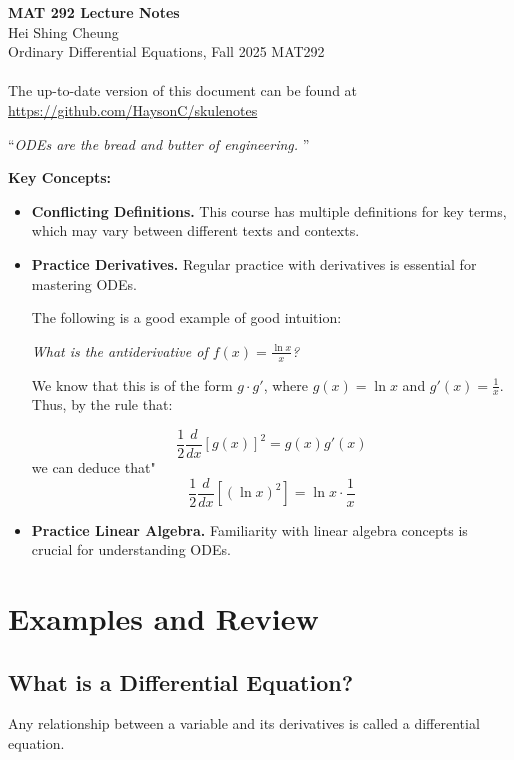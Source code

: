 \documentclass[11pt]{article}
\begin{document}
\thispagestyle{empty}
{\LARGE \bf MAT 292 Lecture Notes}\\
{\large Hei Shing Cheung}\\
Ordinary Differential Equations, Fall 2025 \hfill MAT292\\
\\
The up-to-date version of this document can be found at \url{https://github.com/HaysonC/skulenotes}\\

\begin{center}
    ``\textit{ODEs are the bread and butter of engineering. }''
\end{center}
\begin{shaded}
    \textbf{Key Concepts:}
    \begin{itemize}
        \item \textbf{Conflicting Definitions. } This course has multiple definitions for key terms, which may vary between different texts and contexts.
        \item \textbf{Practice Derivatives. } Regular practice with derivatives is essential for mastering ODEs.
        \begin{example}
            The following is a good example of good intuition:

            \textit{What is the antiderivative of $f(x) = \frac{\ln x}{x}$?}

            We know that this is of the form $g \cdot g'$, where $g(x) = \ln x$ and $g'(x) = \frac{1}{x}$. Thus, by the rule that:

            $$
            \frac{1}{2} \frac{d}{dx} [g(x)]^2 = g(x) g'(x)
            $$ 
            we can deduce that"
            $$
            \frac{1}{2} \frac{d}{dx} [(\ln x)^2] = \ln x \cdot \frac{1}{x}
            $$
        \end{example}
        \item \textbf{Practice Linear Algebra. } Familiarity with linear algebra concepts is crucial for understanding ODEs.
    \end{itemize}
\end{shaded}
\section{Examples and Review}
\subsection{What is a Differential Equation?}
\begin{definition}
     Any relationship between a variable and its derivatives is called a differential equation. 
\end{definition}
\end{document}
